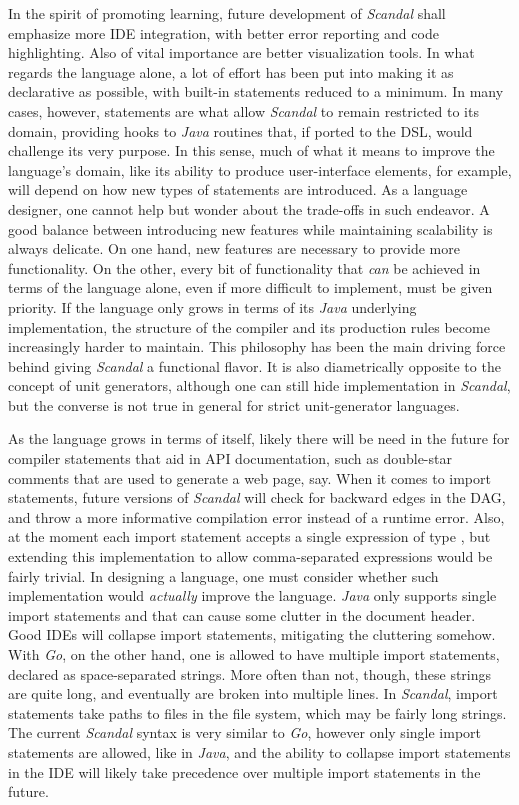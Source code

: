 In the spirit of promoting learning, future development of \emph{Scandal} shall emphasize more IDE integration, with better error reporting and code highlighting. Also of vital importance are better visualization tools. In what regards the language alone, a lot of effort has been put into making it as declarative as possible, with built-in statements reduced to a minimum. In many cases, however, statements are what allow \emph{Scandal} to remain restricted to its domain, providing hooks to \emph{Java} routines that, if ported to the DSL, would challenge its very purpose. In this sense, much of what it means to improve the language's domain, like its ability to produce user-interface elements, for example, will depend on how new types of statements are introduced. As a language designer, one cannot help but wonder about the trade-offs in such endeavor. A good balance between introducing new features while maintaining scalability is always delicate. On one hand, new features are necessary to provide more functionality. On the other, every bit of functionality that \emph{can} be achieved in terms of the language alone, even if more difficult to implement, must be given priority. If the language only grows in terms of its \emph{Java} underlying implementation, the structure of the compiler and its production rules become increasingly harder to maintain. This philosophy has been the main driving force behind giving \emph{Scandal} a functional flavor. It is also diametrically opposite to the concept of unit generators, although one can still hide implementation in \emph{Scandal}, but the converse is not true in general for strict unit-generator languages.

As the language grows in terms of itself, likely there will be need in the future for compiler statements that aid in API documentation, such as double-star comments that are used to generate a web page, say. When it comes to import statements, future versions of \emph{Scandal} will check for backward edges in the DAG, and throw a more informative compilation error instead of a runtime error. Also, at the moment each import statement accepts a single expression of type , but extending this implementation to allow comma-separated expressions would be fairly trivial. In designing a language, one must consider whether such implementation would \emph{actually} improve the language. \emph{Java} only supports single import statements and that can cause some clutter in the document header. Good IDEs will collapse import statements, mitigating the cluttering somehow. With \emph{Go}, on the other hand, one is allowed to have multiple import statements, declared as space-separated strings. More often than not, though, these strings are quite long, and eventually are broken into multiple lines. In \emph{Scandal}, import statements take paths to files in the file system, which may be fairly long strings. The current \emph{Scandal} syntax is very similar to \emph{Go}, however only single import statements are allowed, like in \emph{Java}, and the ability to collapse import statements in the IDE will likely take precedence over multiple import statements in the future.

